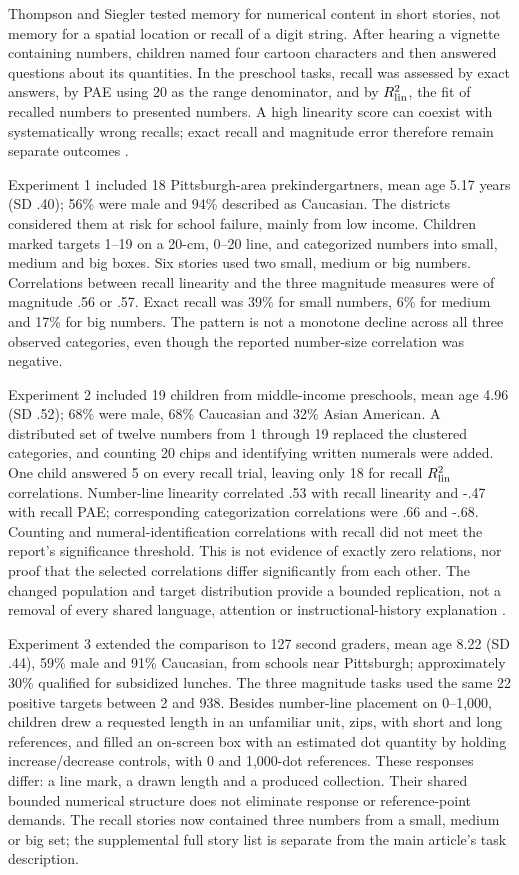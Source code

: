 Thompson and Siegler tested memory for numerical content in short
stories, not memory for a spatial location or recall of a digit string.
After hearing a vignette containing numbers, children named four cartoon
characters and then answered questions about its quantities. In the
preschool tasks, recall was assessed by exact answers, by PAE using
20 as the range denominator, and by \(R^2_{\rm lin}\), the fit of
recalled numbers to presented numbers. A high linearity score can
coexist with systematically wrong recalls; exact recall and magnitude
error therefore remain separate outcomes
\cite[pp.~1276--1277]{ThompsonSiegler2010MemoryNL}.

Experiment 1 included 18 Pittsburgh-area prekindergartners, mean age
5.17 years (SD .40); 56\% were male and 94\% described as Caucasian.
The districts considered them at risk for school failure, mainly from
low income. Children marked targets 1--19 on a 20-cm, 0--20 line,
and categorized numbers into small, medium and big boxes. Six stories
used two small, medium or big numbers. Correlations between recall
linearity and the three magnitude measures were of magnitude .56
or .57. Exact recall was 39\% for small numbers, 6\% for medium
and 17\% for big numbers. The pattern is not a monotone decline
across all three observed categories, even though the reported
number-size correlation was negative.

Experiment 2 included 19 children from middle-income preschools,
mean age 4.96 (SD .52); 68\% were male, 68\% Caucasian and
32\% Asian American. A distributed set of twelve numbers from 1
through 19 replaced the clustered categories, and counting 20 chips
and identifying written numerals were added. One child answered 5 on
every recall trial, leaving only 18 for recall \(R^2_{\rm lin}\)
correlations. Number-line linearity correlated .53 with recall
linearity and -.47 with recall PAE; corresponding categorization
correlations were .66 and -.68. Counting and numeral-identification
correlations with recall did not meet the report's significance
threshold. This is not evidence of exactly zero relations, nor proof
that the selected correlations differ significantly from each other.
The changed population and target distribution provide a bounded
replication, not a removal of every shared language, attention or
instructional-history explanation
\cite[Tables 1--2]{ThompsonSiegler2010MemoryNL}.

Experiment 3 extended the comparison to 127 second graders, mean
age 8.22 (SD .44), 59\% male and 91\% Caucasian, from schools
near Pittsburgh; approximately 30\% qualified for subsidized lunches.
The three magnitude tasks used the same 22 positive targets between
2 and 938. Besides number-line placement on 0--1,000, children
drew a requested length in an unfamiliar unit, zips, with short and
long references, and filled an on-screen box with an estimated dot
quantity by holding increase/decrease controls, with 0 and 1,000-dot
references. These responses differ: a line mark, a drawn length and
a produced collection. Their shared bounded numerical structure
does not eliminate response or reference-point demands.
The recall stories now contained three numbers from a small,
medium or big set; the supplemental full story list is separate
from the main article's task description.

